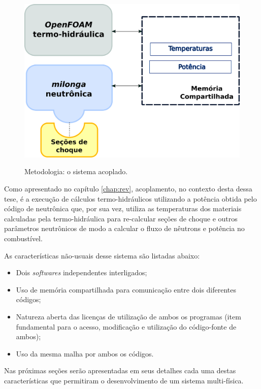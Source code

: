 \begin{figure}[htb]
  \caption{Metodologia: o sistema acoplado.}
  \centering\includegraphics[scale=0.6]{figuras/metodologia2.png}
  \label{metodoetapas}
\end{figure}

Como apresentado no capítulo \ref{chap:rev}, acoplamento, no contexto desta dessa tese, é a execução
de cálculos termo-hidráulicos utilizando a potência obtida pelo código de neutrônica que, por sua vez,
utiliza as temperaturas dos materiais calculadas pela termo-hidráulica para re-calcular seções de choque
e outros parâmetros neutrônicos de modo a calcular o fluxo de nêutrons e potência no combustível.

As características não-usuais desse sistema são listadas abaixo:

\begin{itemize}
\item Dois \textit{softwares} independentes interligados;
\item Uso de memória compartilhada para comunicação entre dois diferentes códigos;
\item Natureza aberta das licenças de utilização de ambos os programas (item fundamental para
  o acesso, modificação e utilização do código-fonte de ambos);
  \item Uso da mesma malha por ambos os códigos.
\end{itemize}

Nas próximas seções serão apresentadas em seus detalhes cada uma destas características que
permitiram o desenvolvimento de um sistema multi-física.

